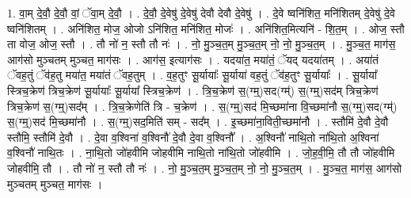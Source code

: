 \documentclass[17pt]{extarticle}
\begin{document}
1. वा॒म् दे॒वौ॒ दे॒वौ॒ वां॒ ॅवा॒म् दे॒वौ॒ । . दे॒वौ॒ दे॒वेषु॑ दे॒वेषु॑ देवौ देवौ दे॒वेषु॑ । . दे॒वे ष्वनि॑शित॒ मनि॑शितम् दे॒वेषु॑ दे॒वे ष्वनि॑शितम् । . अनि॑शित॒ मोज॒ ओजो ऽनि॑शित॒ मनि॑शित॒ मोजः॑ । . अनि॑शित॒मित्यनि॑ - शि॒त॒म् । . ओज॒ स्तौ ता वोज॒ ओज॒ स्तौ । . तौ नो॑ न॒ स्तौ तौ नः॑ । . नो॒ मु॒ञ्च॒त॒म् मु॒ञ्च॒त॒म् नो॒ नो॒ मु॒ञ्च॒त॒म् । . मु॒ञ्च॒त॒ माग॑स॒ आग॑सो मुञ्चतम् मुञ्चत॒ माग॑सः । . आग॑स॒ इत्याग॑सः । . यदया॑त॒ मया॑तं॒ ॅयद् यदया॑तम् । . अया॑तं ॅवह॒तुं ॅव॑ह॒तु मया॑त॒ मया॑तं ॅवह॒तुम् । . व॒ह॒तुꣳ सू॒र्यायाः᳚ सू॒र्याया॑ वह॒तुं ॅव॑ह॒तुꣳ सू॒र्यायाः᳚ । . सू॒र्याया᳚ स्त्रिच॒क्रेण॑ त्रिच॒क्रेण॑ सू॒र्यायाः᳚ सू॒र्याया᳚ स्त्रिच॒क्रेण॑ । . त्रि॒च॒क्रेण॑ स॒(ग्म्॒)सद(ग्म्॑) स॒(ग्म्॒)सद॑म् त्रिच॒क्रेण॑ त्रिच॒क्रेण॑ स॒(ग्म्॒)सद᳚म् । . त्रि॒च॒क्रेणेति॑ त्रि - च॒क्रेण॑ । . स॒(ग्म्॒)सद॑ मि॒च्छमा॑ना वि॒च्छमा॑नौ स॒(ग्म्॒)सद(ग्म्॑) स॒(ग्म्॒)सद॑ मि॒च्छमा॑नौ । . स॒(ग्म्॒)सद॒मिति॑ सम् - सद᳚म् । . इ॒च्छमा॑ना॒विती॒च्छमा॑नौ । . स्तौमि॑ दे॒वौ दे॒वौ स्तौमि॒ स्तौमि॑ दे॒वौ । . दे॒वा व॒श्विना॑ व॒श्विनौ॑ दे॒वौ दे॒वा व॒श्विनौ᳚ । . अ॒श्विनौ॑ नाथि॒तो ना॑थि॒तो अ॒श्विना॑ व॒श्विनौ॑ नाथि॒तः । . ना॒थि॒तो जो॑हवीमि जोहवीमि नाथि॒तो ना॑थि॒तो जो॑हवीमि । . जो॒ह॒वी॒मि॒ तौ तौ जो॑हवीमि जोहवीमि॒ तौ । . तौ नो॑ न॒ स्तौ तौ नः॑ । . नो॒ मु॒ञ्च॒त॒म् मु॒ञ्च॒त॒म् नो॒ नो॒ मु॒ञ्च॒त॒म् । . मु॒ञ्च॒त॒ माग॑स॒ आग॑सो मुञ्चतम् मुञ्चत॒ माग॑सः । \newline
\end{document}
